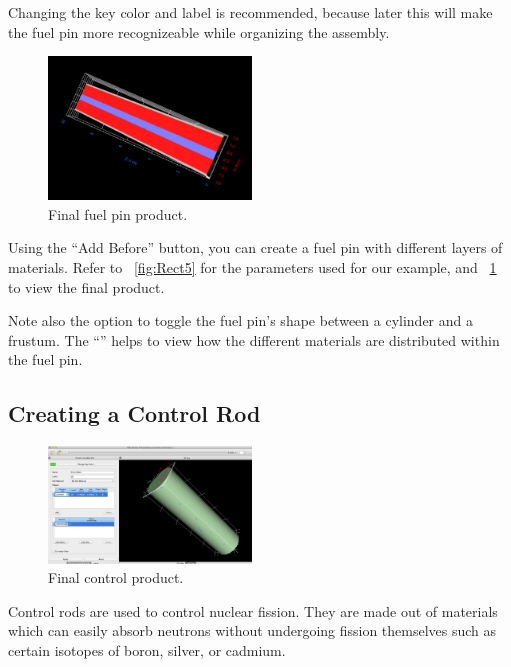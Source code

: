 Changing the key color and label is recommended, because later this will make the fuel pin more recognizeable while organizing the assembly.

\begin{figure}
  \begin{center}
    \includegraphics[width=0.48\textwidth]{Images/rect-pin.png}
  \end{center}
  \caption{Final fuel pin product.}
  \label{fig:Rect6}
\end{figure}
Using the ``Add Before'' button, you can create a fuel pin with different layers of materials.  Refer to ~\ref{fig:Rect5} for the parameters used for our example, and ~\ref{fig:Rect6} to view the final product.

Note also the option to toggle the fuel pin's shape between a cylinder and a frustum.  The ``'' helps to view how the different materials are distributed within the fuel pin.

\subsection{Creating a Control Rod}
\begin{figure}
  \begin{center}
    \includegraphics[width=0.48\textwidth]{Images/rect-control-rod.png}
  \end{center}
  \caption{Final control product.}
  \label{fig:Rect7}
\end{figure}

Control rods are used to control nuclear fission. They are made out of materials which can easily absorb neutrons without undergoing fission themselves such as certain isotopes of boron, silver, or cadmium.

